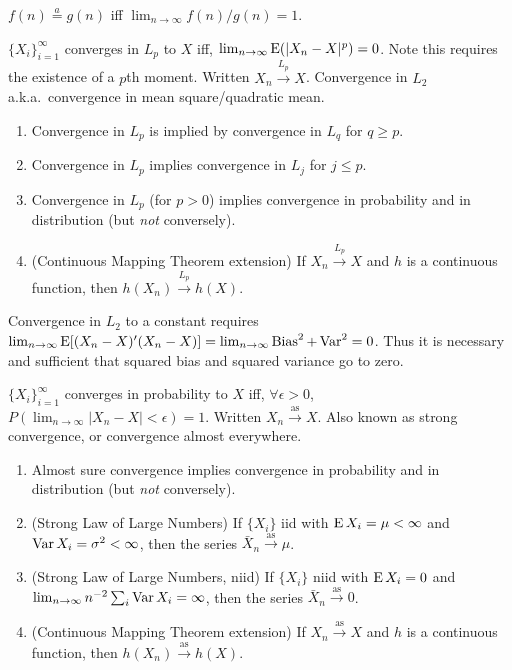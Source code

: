 \documentclass[8pt,letterpaper, landscape]{extarticle} %
\begin{document}
\begin{multicols}{3}
\begin{description}
 $ f(n) \stackrel{a}{=} g(n) $ iff $ \lim_{n \to \infty} f(n) / g(n) = 1 $.

 $ \{ X_i \}_{i=1}^{\infty} $ converges in $ L_p $ to $ X $ iff, $ \lim_{n \to \infty} \operatorname{E}( |X_n - X|^p) = 0 $. Note this requires the existence of a $ p $th moment. Written $ X_n \xrightarrow{L_p} X $. Convergence in $ L_2 $ a.k.a.\ convergence in mean square/quadratic mean.
\begin{enumerate}
\item Convergence in $ L_p $ is implied by convergence in $ L_q $ for $ q \geq p $.
\item Convergence in $ L_p $ implies convergence in $ L_j $ for $ j \leq p $.
\item Convergence in $ L_p $ (for $ p>0 $) implies convergence in probability and in distribution (but \textit{not} conversely).
\item (Continuous Mapping Theorem extension) If $ X_n \xrightarrow{L_p} X $ and $ h $ is a continuous function, then $ h(X_n) \xrightarrow{L_p} h(X) $.
\end{enumerate}
Convergence in $ L_2 $ to a constant requires $ \lim_{n \to \infty} \operatorname{E} [(X_n - X)' (X_n - X)] = \lim_{n \to \infty} \operatorname{Bias}^2 + \operatorname{Var}^2 = 0 $. Thus it is necessary and sufficient that squared bias and squared variance go to zero. 

 $ \{ X_i \}_{i=1}^{\infty} $ converges in probability to $ X $ iff, $ \forall \epsilon > 0 $, $ P( \lim_{n \to \infty} |X_n - X| < \epsilon ) = 1 $. Written $ X_n \xrightarrow{\text{as}} X $. Also known as strong convergence, or convergence almost everywhere.
\begin{enumerate}
\item Almost sure convergence implies convergence in probability and in distribution (but \textit{not} conversely).
\item (Strong Law of Large Numbers) If $ \{ X_i \} $ iid with $ \operatorname{E} X_i = \mu < \infty $ and $ \operatorname{Var} X_i = \sigma^2 < \infty $, then the series $ \bar{X}_n \xrightarrow{\text{as}} \mu $.
\item (Strong Law of Large Numbers, niid) If $ \{ X_i \} $ niid with $ \operatorname{E} X_i = 0 $ and $ \lim_{n \to \infty} n^{-2} \sum_{i} \operatorname{Var} X_i = \infty $, then the series $ \bar{X}_n \xrightarrow{\text{as}} 0 $.
\item (Continuous Mapping Theorem extension) If $ X_n \xrightarrow{\text{as}} X $ and $ h $ is a continuous function, then $ h(X_n) \xrightarrow{\text{as}} h(X) $.
\end{enumerate}


\end{description}
\end{multicols}
\end{document}
